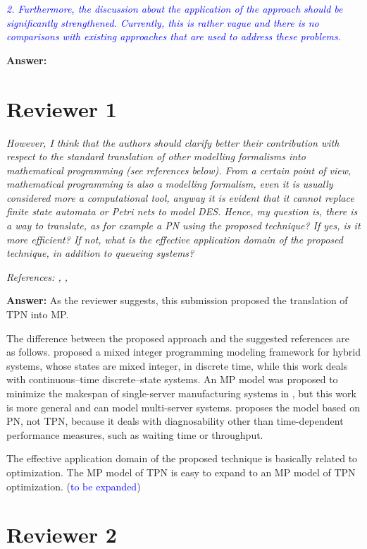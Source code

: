 \documentclass[suppldata]{interact}
\begin{document}
\textit{\textcolor{blue} {2. Furthermore, the discussion about the application of the approach should be significantly strengthened. Currently, this is rather vague and there is no comparisons with existing approaches that are used to address these problems.}}

\noindent
\textbf{Answer:}


\section{Reviewer 1}
\textit{However, I think that the authors should clarify better their contribution with respect to the standard translation of other modelling formalisms into mathematical programming (see references below). From a certain point of view, mathematical programming is also a modelling formalism, even it is usually considered more a computational tool, anyway it is evident that it cannot replace finite state automata or Petri nets to model DES. Hence, my question is, there is a way to translate, as for example a PN using the proposed technique? If yes, is it more efficient? If not, what is the effective application domain of the proposed technique, in addition to queueing systems?}


\textit{References: \cite{basile2012k}, \cite{basile2012k}, \cite{bemporad1999control}}

\noindent
\textbf{Answer:} As the reviewer suggests, this submission proposed the translation of TPN into MP. 


The difference between the proposed approach and the suggested references are as follows. \cite{bemporad1999control} proposed a mixed integer programming modeling framework for hybrid systems, whose states are mixed integer, in discrete time, while this work deals with continuous--time discrete--state systems. An MP model was proposed to minimize the makespan of single-server manufacturing systems in \cite{di2020makespan}, but this work is more general and can model multi-server systems. \cite{basile2012k} proposes the model based on PN, not TPN, because it deals with diagnosability other than time-dependent performance measures, such as waiting time or throughput. 


The effective application domain of the proposed technique is basically related to optimization. The MP model of TPN is easy to expand to an MP model of TPN optimization. (\textcolor{blue}{to be expanded})


\section{Reviewer 2}
\end{document}
